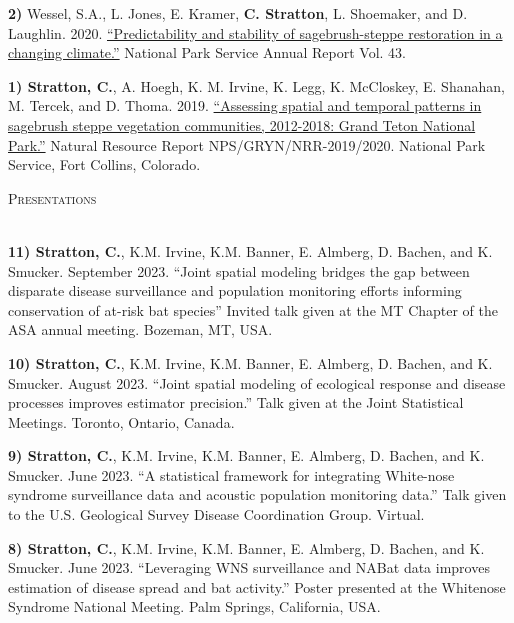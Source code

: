\documentclass[a4paper]{article}
\newcommand{\lineunder} {
	\vspace*{-8pt} \\
	\hspace*{-18pt} \hrulefill \\
}
\newcommand{\header} [1] {
	{\hspace*{-18pt}\vspace*{6pt} \textsc{#1}}
	\vspace*{-6pt} \lineunder
}
\begin{document}
\textbf{2)} Wessel, S.A., L. Jones, E. Kramer, \textbf{C. Stratton}, L.
Shoemaker, and D. Laughlin. 2020.
\href{https://journals.uwyo.edu/index.php/uwnpsrc/article/view/6791/6301}{``Predictability
and stability of sagebrush-steppe restoration in a changing climate.''}
National Park Service Annual Report Vol. 43. \vspace*{2mm}

\textbf{1) Stratton, C.}, A. Hoegh, K. M. Irvine, K. Legg, K. McCloskey,
E. Shanahan, M. Tercek, and D. Thoma. 2019.
\href{https://irma.nps.gov/DataStore/DownloadFile/631136}{``Assessing
spatial and temporal patterns in sagebrush steppe vegetation
communities, 2012-2018: Grand Teton National Park.''} Natural Resource
Report NPS/GRYN/NRR-2019/2020. National Park Service, Fort Collins,
Colorado. \vspace*{2mm}

\header{Presentations}
\vspace*{2mm}

\textbf{11) Stratton, C.}, K.M. Irvine, K.M. Banner, E. Almberg, D.
Bachen, and K. Smucker. September 2023. ``Joint spatial modeling bridges
the gap between disparate disease surveillance and population monitoring
efforts informing conservation of at-risk bat species'' Invited talk
given at the MT Chapter of the ASA annual meeting. Bozeman, MT, USA.
\vspace*{2mm}

\textbf{10) Stratton, C.}, K.M. Irvine, K.M. Banner, E. Almberg, D.
Bachen, and K. Smucker. August 2023. ``Joint spatial modeling of
ecological response and disease processes improves estimator
precision.'' Talk given at the Joint Statistical Meetings. Toronto,
Ontario, Canada. \vspace*{2mm}

\textbf{9) Stratton, C.}, K.M. Irvine, K.M. Banner, E. Almberg, D.
Bachen, and K. Smucker. June 2023. ``A statistical framework for
integrating White-nose syndrome surveillance data and acoustic
population monitoring data.'' Talk given to the U.S. Geological Survey
Disease Coordination Group. Virtual. \vspace*{2mm}

\textbf{8) Stratton, C.}, K.M. Irvine, K.M. Banner, E. Almberg, D.
Bachen, and K. Smucker. June 2023. ``Leveraging WNS surveillance and
NABat data improves estimation of disease spread and bat activity.''
Poster presented at the Whitenose Syndrome National Meeting. Palm
Springs, California, USA. \vspace*{2mm}
\end{document}
